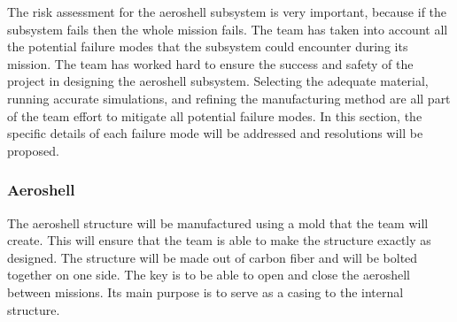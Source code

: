 The risk assessment for the aeroshell subsystem is very important, because if the subsystem fails then the whole mission fails. The team has taken into account all the potential failure modes that the subsystem could encounter during its mission. The team has worked hard to ensure the success and safety of the project in designing the aeroshell subsystem. Selecting the adequate material, running accurate simulations, and refining the manufacturing method are all part of the team effort to mitigate all potential failure modes. In this section, the specific details of each failure mode will be addressed and resolutions will be proposed. 


\subsubsection{Aeroshell}
\indent\indent The aeroshell structure will be manufactured using a mold that the team will create. This will ensure that the team is able to make the structure exactly as designed. The structure will be made out of carbon fiber and will be bolted together on one side. The key is to be able to open and close the aeroshell between missions. Its main purpose is to serve as a casing to the internal structure.  
\begin{table}[H]
\caption{\label{tab:aeroshell_strucure} Aeroshell Structure Failure Modes \& Probabilities}
\centering

\end{table}
